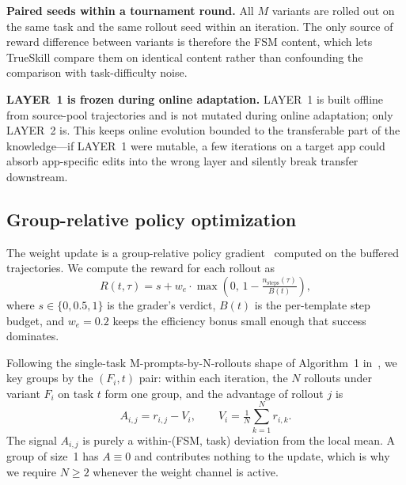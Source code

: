 \textbf{Paired seeds within a tournament round.} All $M$ variants are rolled out
on the same task and the same rollout seed within an iteration. The only source
of reward difference between variants is therefore the FSM content, which lets
TrueSkill compare them on identical content rather than confounding the
comparison with task-difficulty noise.

\textbf{LAYER~1 is frozen during online adaptation.} LAYER~1 is built offline
from source-pool trajectories and is not mutated during online adaptation; only
LAYER~2 is. This keeps online evolution bounded to the transferable part of the
knowledge---if LAYER~1 were mutable, a few iterations on a target app could
absorb app-specific edits into the wrong layer and silently break transfer
downstream.

\subsection{Group-relative policy optimization}
\label{sec:method-grpo}

The weight update is a group-relative policy
gradient~\citep{shao2024deepseekmath} computed on the buffered trajectories. We
compute the reward for each rollout as
\begin{equation}
R(t,\tau) = s + w_e \cdot \max\!\left(0,\, 1 - \tfrac{n_{\text{steps}}(\tau)}{B(t)}\right),
\label{eq:reward}
\end{equation}
where $s \in \{0, 0.5, 1\}$ is the grader's verdict, $B(t)$ is the per-template
step budget, and $w_e = 0.2$ keeps the efficiency bonus small enough that
success dominates.

Following the single-task M-prompts-by-N-rollouts shape of Algorithm~1
in~\citet{zhang2026espl}, we key groups by the $(F_i, t)$ pair: within each
iteration, the $N$ rollouts under variant $F_i$ on task $t$ form one group, and
the advantage of rollout $j$ is
\begin{equation}
A_{i,j} = r_{i,j} - V_i, \qquad V_i = \tfrac{1}{N}\sum_{k=1}^{N} r_{i,k}.
\label{eq:advantage}
\end{equation}
The signal $A_{i,j}$ is purely a within-(FSM, task) deviation from the local
mean. A group of size~1 has $A \equiv 0$ and contributes nothing to the update,
which is why we require $N \ge 2$ whenever the weight channel is active.

